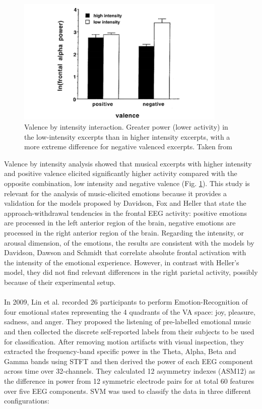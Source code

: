 \begin{figure}[h!]
\includegraphics[width=10cm]{img/related_work/valence_intensity.png}
\centering
\caption{Valence by intensity interaction. Greater power (lower activity) in the low-intensity excerpts than in higher intensity excerpts, with a more extreme difference for negative valenced excerpts. Taken from \cite{schmidt_frontal_2001}}\label{fig_schmidt_valence_intensity}
\end{figure}
Valence by intensity analysis showed that musical excerpts with higher intensity and positive valence elicited significantly higher activity compared with the opposite combination, low intensity and negative valence (Fig. \ref{fig_schmidt_valence_intensity}). This study is relevant for the analysis of music-elicited emotions because it provides a validation for the models proposed by Davidson, Fox and Heller that state the approach-withdrawal tendencies in the frontal \ac{EEG} activity: positive emotions are processed in the left anterior region of the brain, negative emotions are processed in the right anterior region of the brain. Regarding the intensity, or arousal dimension, of the emotions, the results are consistent with the models by Davidson, Dawson and Schmidt that correlate absolute frontal activation with the intensity of the emotional experience. However, in contrast with Heller’s model, they did not find relevant differences in the right parietal activity, possibly because of their experimental setup.
\\
\\
In 2009, Lin et al. \cite{lin_eeg-based_2009} recorded 26 participants to perform Emotion-Recognition of four emotional states representing the 4 quadrants of the \ac{VA} space: joy, pleasure, sadness, and anger. They proposed the listening of pre-labelled emotional music and then collected the discrete self-reported labels from their subjects to be used for classification. After removing motion artifacts with visual inspection, they extracted the frequency-band specific power in the Theta, Alpha, Beta and Gamma bands using \ac{STFT} and then derived the power of each \ac{EEG} component across time over 32-channels. They calculated 12 asymmetry indexes (ASM12) as the difference in power from 12 symmetric electrode pairs for at total 60 features over five \ac{EEG} components. \ac{SVM} was used to classify the data in three different configurations:

